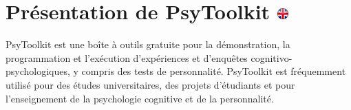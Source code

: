 \documentclass[
]{book}
\begin{document}
\hypertarget{pruxe9sentation-de-psytoolkit}{%
\chapter[Présentation de PsyToolkit ]{\texorpdfstring{Présentation de
PsyToolkit
\href{https://www.psytoolkit.org/\#_about_psytoolkit}{\protect\includegraphics{img/ukflag.png}}}{Présentation de PsyToolkit }}\label{pruxe9sentation-de-psytoolkit}}

PsyToolkit est une boîte à outils gratuite pour la démonstration, la
programmation et l'exécution d'expériences et d'enquêtes
cognitivo-psychologiques, y compris des tests de personnalité.
PsyToolkit est fréquemment utilisé pour des études universitaires, des
projets d'étudiants et pour l'enseignement de la psychologie cognitive
et de la personnalité.
\end{document}
